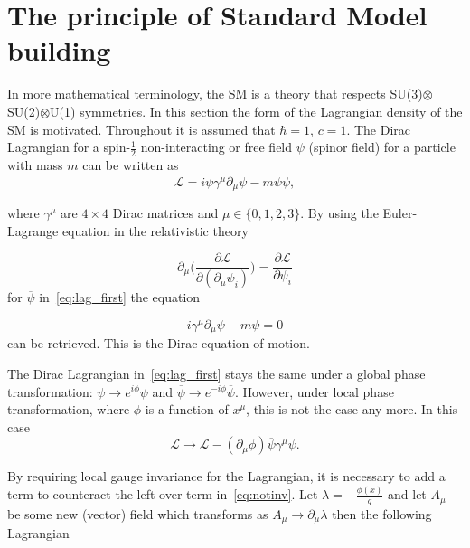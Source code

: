 \section{The principle of Standard Model building}
\label{build}
In more mathematical terminology, the \gls{SM} is a theory that respects SU(3)$\otimes$SU(2)$\otimes$U(1) symmetries. In this section the form of the Lagrangian density of the \gls{SM} is motivated. Throughout it is assumed that $\hbar=1$, $c=1$. The Dirac Lagrangian for a spin-$\frac{1}{2}$ non-interacting or free field $\psi$ (spinor field) for a particle with mass $m$ can be written as 
\begin{equation}
\mathcal{L} = i\overline{\psi}\gamma^{\mu}\partial_{\mu}\psi - m\overline{\psi}\psi,
\label{eq:lag_first}
\end{equation}

\noindent where $\gamma^{\mu}$ are $4\times 4$ Dirac matrices and $\mu\in\{0,1,2,3\}$. By using the Euler-Lagrange equation in the relativistic theory

\begin{equation}
	\partial_{\mu}\Big(\frac{\partial{\mathcal{L}}}{\partial(\partial_{\mu}\psi_{i})} \Big) =\frac{\partial \mathcal{L}}{\partial\psi_{i}}
\label{eq:lag_first}
\end{equation}
for $\overline\psi$ in~\autoref{eq:lag_first} the equation 

\begin{equation}
 i\gamma^{\mu}\partial_{\mu}\psi - m\psi = 0
\label{eq:lag_first2}
\end{equation}
can be retrieved. This is the Dirac equation of motion.

The Dirac Lagrangian in~\autoref{eq:lag_first} stays the same under a global phase transformation: $\psi \rightarrow e^{i\phi}\psi$ and $\overline\psi \rightarrow e^{-i\phi}\overline\psi$. However, under local phase transformation, where $\phi$ is a function of $x^{\mu}$, this is not the case any more. In this case
\begin{equation}
\mathcal{L} \rightarrow \mathcal{L}- (\partial_{\mu}\phi) \overline{\psi}\gamma^{\mu}\psi.
\label{eq:notinv}
\end{equation}

By requiring local gauge invariance for the Lagrangian, it is necessary to add a term to counteract the left-over term in~\autoref{eq:notinv}. Let $\lambda=-\frac{\phi(x)}{q}$ and let $A_{\mu}$ be some new (vector) field which transforms as $A_{\mu} \rightarrow \partial_{\mu}\lambda$ then the following Lagrangian

